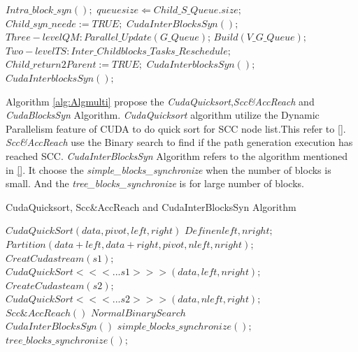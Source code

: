 \documentclass{llncs}
\begin{document}
\begin{algorithm}[htbp]
\begin{algorithmic}[1]
	            \EndIf
                \State $Intra\_block\_syn();$
		             \State $queuesize \Leftarrow Child\_S\_Queue.size;$
			             \State $Child\_syn\_neede := TRUE;$
                     \EndIf
                \EndIf
	            \State $CudaInterBlocksSyn();$
		            \State $Three-levelQM: Parallel\_Update(G\_Queue)$;
                        \State $Build(V\_G\_Queue);$
                        \State $Two-levelTS: Inter\_Childblocks\_Tasks\_Reschedule;$
			                 \State $Child\_return2Parent := TRUE;$
                        \EndIf
			         \EndIf
                     \State $CudaInterblocksSyn();$
                \EndIf	
            \EndWhile
            \State $CudaInterblocksSyn();$
            \end{algorithmic}
            \end{algorithm}

Algorithm \ref{alg:Algmulti} propose the \textsl{CudaQuicksort},\textsl{Scc\&AccReach} and \textsl{CudaBlocksSyn} Algorithm. \textsl{CudaQuicksort} algorithm utilize the Dynamic Parallelism feature of CUDA to do quick sort for SCC node list.This refer to \ref{}. \textsl{Scc\&AccReach} use the Binary search to find if the path generation execution has reached SCC. \textsl{CudaInterBlocksSyn} Algorithm refers to the algorithm mentioned in \ref{}. It choose the \textsl{simple\_blocks\_synchronize} when the number of blocks is small. And the \textsl{tree\_blocks\_synchronize} is for large number of blocks.

            \begin{algorithm}[htbp]
            \caption{CudaQuicksort, Scc\&AccReach and CudaInterBlocksSyn Algorithm}
            \label{alg:Algmulti}
            \begin{algorithmic}[1]
            \State $CudaQuickSort(data, pivot, left, right)$
                \State $Define nleft,nright;$
                \State $Partition(data+left, data+right, pivot, nleft, nright);$
                    $CreatCudastream(s1);$
                    $CudaQuickSort<<<...s1>>>(data, left, nright);$
                \EndIf
                    $CreateCudasteam(s2);$
                    $CudaQuickSort<<<...s2>>>(data, nleft, right);$
                \EndIf
                \\
            \State $Scc\&AccReach()$
                \State $Normal Binary Search$
                \\
            \State $CudaInterBlocksSyn()$
                    $simple\_blocks\_synchronize();$
                \Else
                    $tree\_blocks\_synchronize();$
                \EndIf
            \end{algorithmic}
            \end{algorithm}
\end{document}
